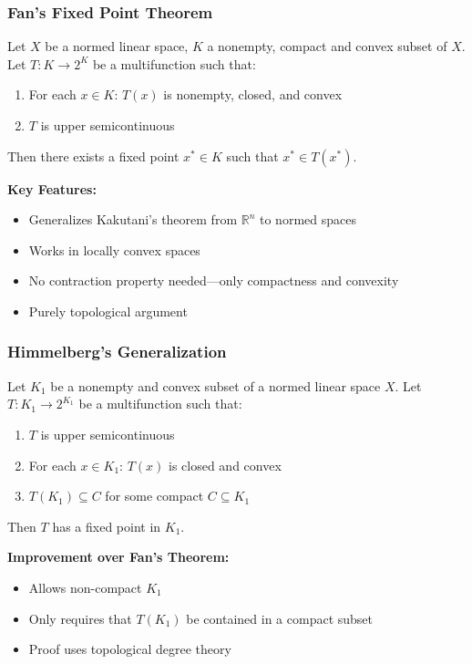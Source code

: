 \documentclass[aspectratio=169,10pt]{beamer}
\begin{document}
\begin{frame}
\frametitle{Fan's Fixed Point Theorem}

\begin{theorem}[Fan, 1952]
Let $X$ be a normed linear space, $K$ a nonempty, compact and convex subset of $X$.
Let $T: K \to 2^K$ be a multifunction such that:
\begin{enumerate}
    \item For each $x \in K$: $T(x)$ is nonempty, closed, and convex
    \item $T$ is upper semicontinuous
\end{enumerate}
Then there exists a fixed point $x^* \in K$ such that $x^* \in T(x^*)$.
\end{theorem}

\vspace{0.3cm}

\textbf{Key Features:}
\begin{itemize}
    \item Generalizes Kakutani's theorem from $\mathbb{R}^n$ to normed spaces
    \item Works in locally convex spaces
    \item No contraction property needed—only compactness and convexity
    \item Purely topological argument
\end{itemize}

\end{frame}

\begin{frame}
\frametitle{Himmelberg's Generalization}

\begin{theorem}[Himmelberg, 1972]
Let $K_1$ be a nonempty and convex subset of a normed linear space $X$.
Let $T: K_1 \to 2^{K_1}$ be a multifunction such that:
\begin{enumerate}
    \item $T$ is upper semicontinuous
    \item For each $x \in K_1$: $T(x)$ is closed and convex
    \item $T(K_1) \subseteq C$ for some compact $C \subseteq K_1$
\end{enumerate}
Then $T$ has a fixed point in $K_1$.
\end{theorem}

\vspace{0.3cm}

\textbf{Improvement over Fan's Theorem:}
\begin{itemize}
    \item Allows non-compact $K_1$
    \item Only requires that $T(K_1)$ be contained in a compact subset
    \item Proof uses topological degree theory
\end{itemize}

\end{frame}
\end{document}
